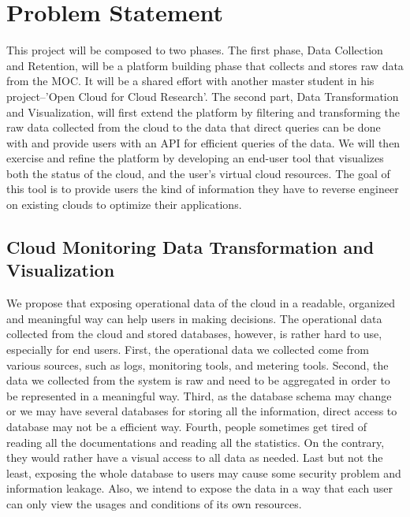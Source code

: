 \section{Problem Statement}
\label{sec:ProblemStatement}



This project will be composed to two phases. The first phase, Data Collection and Retention, will be a platform building phase that collects and stores raw data from the MOC. It will be a shared effort with another master student in his project--'Open Cloud for Cloud Research'.  
The second part, Data Transformation and Visualization, will first extend the platform by filtering and transforming the raw data collected from the cloud to the data that direct queries can be done with and provide users with an API for efficient queries of the data. We will then exercise and refine the platform by developing an end-user tool that visualizes both the status of the cloud, and the user’s virtual cloud resources. The goal of this tool is to provide users the kind of information they have to reverse engineer on existing clouds to optimize their applications.



\subsection{Cloud Monitoring Data Transformation and Visualization}
  We propose that exposing operational data of the cloud in a readable, organized and meaningful way can help users in making decisions. The operational data collected from the cloud and stored databases, however, is rather hard to use, especially for end users. First, the operational data we collected come from various sources, such as logs, monitoring tools, and metering tools. Second, the data we collected from the system is raw and need to be aggregated in order to be represented in a meaningful way. Third, as the database schema may change or we may have several databases for storing all the information, direct access to database may not be a efficient way. Fourth, people sometimes get tired of reading all the documentations and reading all the statistics. On the contrary, they would rather have a visual access to all data as needed. Last but not the least, exposing the whole database to users may cause some security problem and information leakage. Also, we intend to expose the data in a way that each user can only view the usages and conditions of its own resources.  

